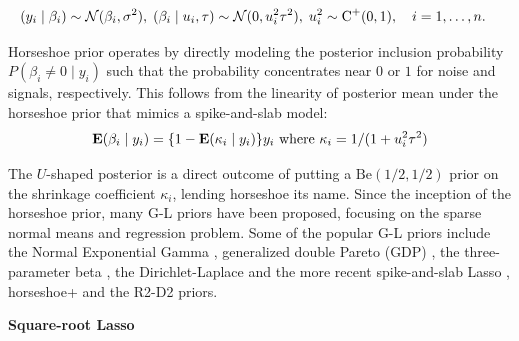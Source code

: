 \documentclass[10pt]{article}
\begin{document}
\begin{align*}
  (y_i \mid \beta_i) & \sim \mathcal{N}(\beta_i , \sigma^2), \;  (\beta_i \mid u_i, \tau) \sim 
  \mathcal{N}(0, u_i^2 \tau^2), \; u_i ^2 \sim \operatorname{C}^{+}(0,1), \quad i = 1, \ldots, n. 
\end{align*}

Horseshoe prior operates by directly modeling the posterior inclusion probability $P(\beta_i \ne 0 \mid y_i)$ such that the probability concentrates near $0$ or $1$ for noise and signals, respectively. This follows from the linearity of posterior mean under the horseshoe prior that mimics a spike-and-slab model:
\begin{equation}
{\bf E}(\beta_i \mid y_i) = \{1- {\bf E}(\kappa_i \mid y_i)\}y_i \text{ where } \kappa_i = 1/(1+u_i^2 \tau^2) \label{eq:kappa}
\end{equation}

The $U$-shaped posterior is a direct outcome of putting a $\text{Be}(1/2,1/2)$ prior on the shrinkage coefficient $\kappa_i$, lending horseshoe its name. Since the inception of the horseshoe prior, many G-L priors have been proposed, focusing on the sparse normal means and regression problem. Some of the popular G-L priors include the Normal Exponential Gamma \citep{griffin2005alternative}, generalized double Pareto (GDP) \citep{armagan2013generalized}, the three-parameter beta \citep{armagan2011generalized}, the Dirichlet-Laplace \citep{bhattacharya2014dirichlet} and the more recent spike-and-slab Lasso \citep{rovckova2016spike}, horseshoe+ \citep{bhadra2015horseshoe+} and the R2-D2 \citep{zhang2016high} priors. 


\noindent \textbf{Square-root Lasso} 
\end{document}

